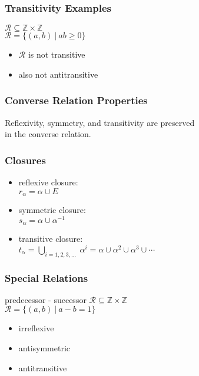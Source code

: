 \documentclass[dvipsnames]{beamer}
\begin{document}
\begin{frame}
  \frametitle{Transitivity Examples}

  $\mathcal{R} \subseteq \mathbb{Z} \times \mathbb{Z}$\\
  $\mathcal{R} = \{(a,b)~|~ab \geq 0\}$

  \medskip
  \begin{itemize}
    \item $\mathcal{R}$ is not transitive
    \item also not antitransitive
  \end{itemize}
\end{frame}

\begin{frame}
  \frametitle{Converse Relation Properties}

  \begin{theorem}
    Reflexivity, symmetry, and transitivity are preserved\\
    in the converse relation.
  \end{theorem}
\end{frame}

\begin{frame}
  \frametitle{Closures}

  \begin{itemize}
    \item reflexive closure:\\
      $r_{\alpha} = \alpha \cup E$

    \pause
    \medskip
    \item symmetric closure:\\
      $s_{\alpha} = \alpha \cup \alpha^{-1}$

    \pause
    \medskip
    \item transitive closure:\\
      $t_{\alpha} = \bigcup_{i=1,2,3, \ldots}~\alpha^i
        = \alpha \cup \alpha^2 \cup \alpha^3 \cup \cdots$
  \end{itemize}
\end{frame}


\begin{frame}
  \frametitle{Special Relations}

  \begin{block}{predecessor - successor}
    $\mathcal{R} \subseteq \mathbb{Z} \times \mathbb{Z}$\\
    $\mathcal{R} = \{(a,b)~|~a-b=1\}$
  \end{block}

  \medskip
  \begin{itemize}
    \item irreflexive
    \item antisymmetric
    \item antitransitive
  \end{itemize}
\end{frame}
\end{document}
